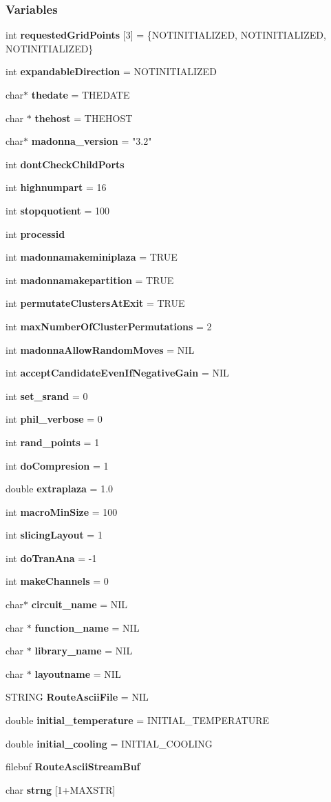 \subsubsection*{Variables}
\begin{CompactItemize}
\item 
int {\bf requested\-Grid\-Points} [3] = \{NOTINITIALIZED, NOTINITIALIZED, NOTINITIALIZED\}
\item 
int {\bf expandable\-Direction} = NOTINITIALIZED
\item 
char$\ast$ {\bf thedate} = THEDATE
\item 
char $\ast$ {\bf thehost} = THEHOST
\item 
char$\ast$ {\bf madonna\_\-version} = "3.2"
\item 
int {\bf dont\-Check\-Child\-Ports}
\item 
int {\bf highnumpart} = 16
\item 
int {\bf stopquotient} = 100
\item 
int {\bf processid}
\item 
int {\bf madonnamakeminiplaza} = TRUE
\item 
int {\bf madonnamakepartition} = TRUE
\item 
int {\bf permutate\-Clusters\-At\-Exit} = TRUE
\item 
int {\bf max\-Number\-Of\-Cluster\-Permutations} = 2
\item 
int {\bf madonna\-Allow\-Random\-Moves} = NIL
\item 
int {\bf accept\-Candidate\-Even\-If\-Negative\-Gain} = NIL
\item 
int {\bf set\_\-srand} = 0
\item 
int {\bf phil\_\-verbose} = 0
\item 
int {\bf rand\_\-points} = 1
\item 
int {\bf do\-Compresion} = 1
\item 
double {\bf extraplaza} = 1.0
\item 
int {\bf macro\-Min\-Size} = 100
\item 
int {\bf slicing\-Layout} = 1
\item 
int {\bf do\-Tran\-Ana} = -1
\item 
int {\bf make\-Channels} = 0
\item 
char$\ast$ {\bf circuit\_\-name} = NIL
\item 
char $\ast$ {\bf function\_\-name} = NIL
\item 
char $\ast$ {\bf library\_\-name} = NIL
\item 
char $\ast$ {\bf layoutname} = NIL
\item 
STRING {\bf Route\-Ascii\-File} = NIL
\item 
double {\bf initial\_\-temperature} = INITIAL\_\-TEMPERATURE
\item 
double {\bf initial\_\-cooling} = INITIAL\_\-COOLING
\item 
filebuf {\bf Route\-Ascii\-Stream\-Buf}
\item 
char {\bf strng} [1+MAXSTR]
\end{CompactItemize}


